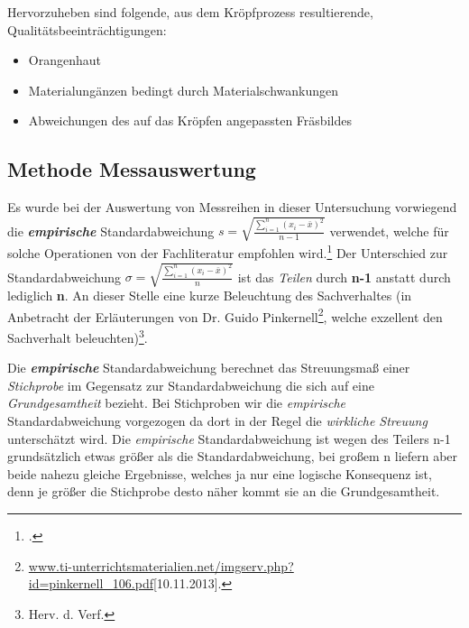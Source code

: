 \documentclass[12pt,a4paper,parskip]{scrartcl}
\begin{document}
Hervorzuheben sind folgende, aus dem Kröpfprozess resultierende, Qualitätsbeeinträchtigungen:
\begin{itemize}
\item Orangenhaut
\item Materialungänzen bedingt durch Materialschwankungen
\item Abweichungen des auf das Kröpfen angepassten Fräsbildes
\end{itemize}











\subsection{Methode Messauswertung}
Es wurde bei der Auswertung von Messreihen in dieser Untersuchung vorwiegend die \textbf{\emph{empirische}} Standardabweichung $ s= \sqrt{\frac{\sum \limits_{i=1}^n (x_i - \bar{x})^2}{n-1}}$ verwendet, welche für solche Operationen von der Fachliteratur empfohlen wird.\footcite[Vgl.][301]{mf} Der Unterschied zur Standardabweichung $ \sigma = \sqrt{\frac{\sum \limits_{i=1}^n (x_i - \bar{x})^2}{n}}$ ist das \emph{Teilen} durch \textbf{n-1} anstatt durch lediglich \textbf{n}.
 An dieser Stelle eine kurze Beleuchtung des Sachverhaltes  (in Anbetracht der Erläuterungen von Dr. Guido Pinkernell\footnote{\url{www.ti-unterrichtsmaterialien.net/imgserv.php?id=pinkernell_106.pdf}[10.11.2013].‎}, welche exzellent  den Sachverhalt beleuchten)\footnote{Herv. d. Verf.}.



Die \textbf{\emph{empirische}} Standardabweichung berechnet das Streuungsmaß einer \emph{Stichprobe} im Gegensatz zur Standardabweichung die sich auf eine \emph{Grundgesamtheit} bezieht. Bei Stichproben wir die \emph{empirische} Standardabweichung vorgezogen da dort in der Regel die \emph{wirkliche Streuung} unterschätzt wird. Die \emph{empirische} Standardabweichung ist wegen des Teilers n-1 grundsätzlich etwas größer als die Standardabweichung, bei großem n liefern aber beide nahezu gleiche Ergebnisse, welches ja nur eine logische Konsequenz ist, denn je größer die Stichprobe desto näher kommt sie an die Grundgesamtheit.

\medskip
\end{document}
